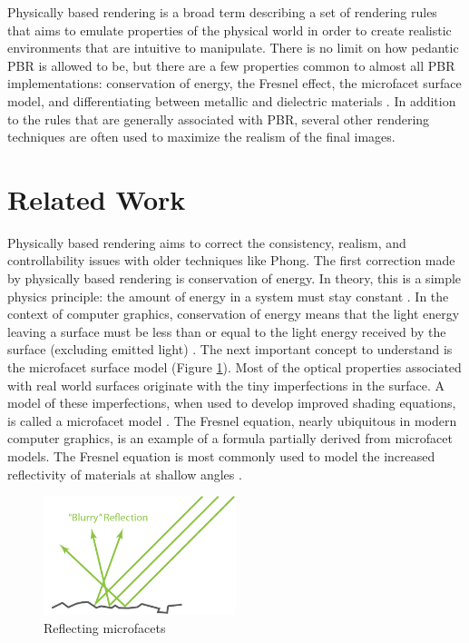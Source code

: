 \documentclass[12pt, letterpaper, twocolumn]{article}
\begin{document}
Physically based rendering is a broad term describing a set of rendering rules
that aims to emulate properties of the physical world in order to create
realistic environments that are intuitive to manipulate. There is no limit on
how pedantic PBR is allowed to be, but there are a few properties common to
almost all PBR implementations:  conservation of energy, the Fresnel effect,
the microfacet surface model, and differentiating between metallic and
dielectric materials \cite{PBEc}. In addition to the rules that are generally
associated with PBR, several other rendering techniques are often used to
maximize the realism of the final images.

\section{Related Work}

Physically based rendering aims to correct the consistency, realism, and
controllability issues with older techniques like Phong. The first correction
made by physically based rendering is conservation of energy. In theory, this
is a simple physics principle: the amount of energy in a system must stay
constant \cite{NERSA}. In the context of computer graphics, conservation of
energy means that the light energy leaving a surface must be less than or
equal to the light energy received by the surface (excluding emitted light)
\cite{lerpGL}. The next important concept to understand is the microfacet
surface model (Figure \ref{microfat}). Most of the optical properties
associated with real world surfaces originate with the tiny imperfections in
the surface. A model of these imperfections, when used to develop improved
shading equations, is called a microfacet model \cite{CoTor}. The Fresnel
equation, nearly ubiquitous in modern computer graphics, is an example of a
formula partially derived from microfacet models. The Fresnel equation is most
commonly used to model the increased reflectivity of materials at shallow
angles \cite{lerpGL}.

\begin{figure}
\centering \includegraphics[width=0.5\textwidth]{pbr_theory_microsurf.png}
\caption{Reflecting microfacets}
\label{microfat}
\end{figure}
\end{document}
